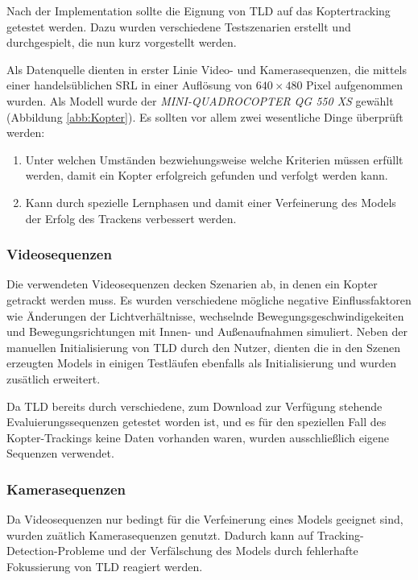 Nach der Implementation sollte die Eignung von TLD auf das Koptertracking getestet werden. Dazu wurden verschiedene Testszenarien erstellt und durchgespielt, die nun kurz vorgestellt werden.

Als Datenquelle dienten in erster Linie Video- und Kamerasequenzen, die mittels einer handelsüblichen SRL in einer Auflösung von $640\times480$ Pixel aufgenommen wurden. Als Modell wurde der \textit{MINI-QUADROCOPTER QG 550 XS} gewählt (Abbildung \ref{abb:Kopter}). Es sollten vor allem zwei wesentliche Dinge überprüft werden:

\begin{enumerate}
\item Unter welchen Umständen bezwiehungsweise welche Kriterien müssen erfüllt werden, damit ein Kopter erfolgreich gefunden und verfolgt werden kann.
\item Kann durch spezielle Lernphasen und damit einer Verfeinerung des Models der Erfolg des Trackens verbessert werden.
\end{enumerate}

\subsubsection{Videosequenzen}
Die verwendeten Videosequenzen decken Szenarien ab, in denen ein Kopter getrackt werden muss. Es wurden verschiedene mögliche negative Einflussfaktoren wie Änderungen der Lichtverhältnisse, wechselnde Bewegungsgeschwindigekeiten und Bewegungsrichtungen mit Innen- und Außenaufnahmen simuliert. Neben der manuellen Initialisierung von TLD durch den Nutzer, dienten die in den Szenen erzeugten Models in einigen Testläufen ebenfalls als Initialisierung und wurden zusätlich erweitert.

Da TLD bereits durch verschiedene, zum Download zur Verfügung stehende Evaluierungssequenzen getestet worden ist, und es für den speziellen Fall des Kopter-Trackings keine Daten vorhanden waren, wurden ausschließlich eigene Sequenzen verwendet.

\subsubsection{Kamerasequenzen}
Da Videosequenzen nur bedingt für die Verfeinerung eines Models geeignet sind, wurden zuätlich Kamerasequenzen genutzt. Dadurch kann auf Tracking-Detection-Probleme und der Verfälschung des Models durch fehlerhafte Fokussierung von TLD reagiert werden.